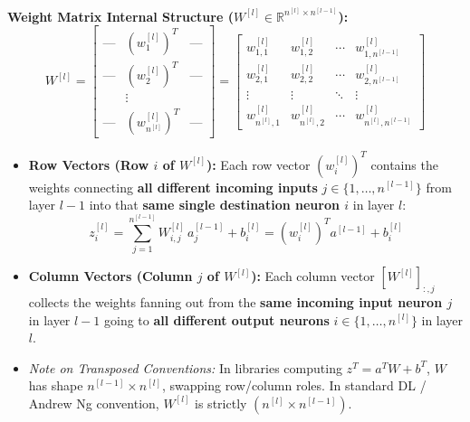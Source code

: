 \documentclass[10pt,a4paper]{article}
\begin{document}
\begin{tcolorbox}[
    colframe=accentred,
    colback=white,
    arc=1.3mm,
    boxrule=0.5pt,
    left=5pt, right=5pt, top=2pt, bottom=2pt
]
\footnotesize
\textbf{Weight Matrix Internal Structure ($W^{[l]} \in \mathbb{R}^{n^{[l]} \times n^{[l-1]}}$):}
\[
W^{[l]} = 
\begin{bmatrix}
\text{---} & (w_1^{[l]})^T & \text{---} \\
\text{---} & (w_2^{[l]})^T & \text{---} \\
& \vdots & \\
\text{---} & (w_{n^{[l]}}^{[l]})^T & \text{---}
\end{bmatrix}
=
\begin{bmatrix}
w_{1, 1}^{[l]} & w_{1, 2}^{[l]} & \cdots & w_{1, n^{[l-1]}}^{[l]} \\
w_{2, 1}^{[l]} & w_{2, 2}^{[l]} & \cdots & w_{2, n^{[l-1]}}^{[l]} \\
\vdots & \vdots & \ddots & \vdots \\
w_{n^{[l]}, 1}^{[l]} & w_{n^{[l]}, 2}^{[l]} & \cdots & w_{n^{[l]}, n^{[l-1]}}^{[l]}
\end{bmatrix}
\]
\begin{itemize}[leftmargin=8pt, itemsep=0.5pt, topsep=0.5pt]
    \item \textbf{Row Vectors (Row $i$ of $W^{[l]}$):} Each row vector $(w_i^{[l]})^T$ contains the weights connecting \textbf{all different incoming inputs} $j \in \{1, \dots, n^{[l-1]}\}$ from layer $l-1$ into that \textbf{same single destination neuron $i$} in layer $l$:
    \[
    z_i^{[l]} = \sum_{j=1}^{n^{[l-1]}} W_{i, j}^{[l]} \, a_j^{[l-1]} + b_i^{[l]} = (w_i^{[l]})^T a^{[l-1]} + b_i^{[l]}
    \]
    \item \textbf{Column Vectors (Column $j$ of $W^{[l]}$):} Each column vector $[W^{[l]}]_{:, j}$ collects the weights fanning out from the \textbf{same incoming input neuron $j$} in layer $l-1$ going to \textbf{all different output neurons} $i \in \{1, \dots, n^{[l]}\}$ in layer $l$.
    \item \textit{Note on Transposed Conventions:} In libraries computing $z^T = a^T W + b^T$, $W$ has shape $n^{[l-1]} \times n^{[l]}$, swapping row/column roles. In standard DL / Andrew Ng convention, $W^{[l]}$ is strictly $(n^{[l]} \times n^{[l-1]})$.
\end{itemize}
\end{tcolorbox}

\newpage

\end{document}
